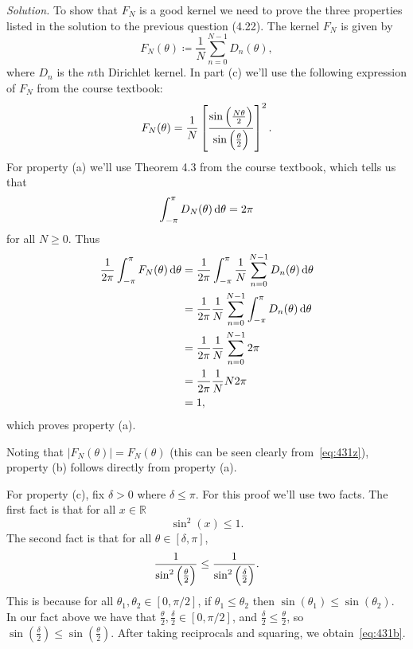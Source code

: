 \documentclass{article}
\newcommand{\R}{\mathbb{R}}
\begin{document}
\textit{Solution.}
To show that $F_N$ is a good kernel we need to prove the three
properties listed in the solution to the previous question (4.22).
The kernel $F_N$ is given by
%
\begin{equation*}
    F_N(\theta) \coloneqq \frac{1}{N} \sum_{n = 0}^{N - 1} D_n (\theta)
    ,
\end{equation*}
%
where $D_n$ is the $n$th Dirichlet kernel. In part (c) we'll use the
following expression of $F_N$ from the course textbook:
%
\begin{equation}
    F_N(\theta) = \frac{1}{N} \sbr{\frac{\sin \del{\frac{N \theta}{2}}}{\sin \del{\frac{\theta}{2}}}}^2
    \label{eq:431z}
    .
\end{equation}
%
For property (a) we'll use Theorem 4.3 from the course textbook, which tells us
that
%
\begin{equation*}
    \int_{- \pi}^\pi D_N(\theta) \dif \theta = 2 \pi
\end{equation*}
%
for all $N \geq 0$. Thus
%
\begin{align*}
    \frac{1}{2 \pi} \int_{- \pi}^\pi F_N(\theta) \dif \theta
        &= \frac{1}{2 \pi} \int_{- \pi}^\pi
            \frac{1}{N} \sum_{n = 0}^{N - 1} D_n(\theta)
            \dif \theta \\
        &= \frac{1}{2 \pi} \frac{1}{N} \sum_{n = 0}^{N - 1}
            \int_{- \pi}^\pi D_n(\theta) \dif \theta \\
        &= \frac{1}{2 \pi} \frac{1}{N} \sum_{n = 0}^{N - 1} 2 \pi \\
        &= \frac{1}{2 \pi} \frac{1}{N} N 2 \pi \\
        &= 1
        ,
\end{align*}
%
which proves property (a).

Noting that $|F_N(\theta)| = F_N(\theta)$ (this can be seen clearly
from~\eqref{eq:431z}), property (b) follows directly from property (a).

For property (c), fix $\delta > 0$ where $\delta \leq \pi$. For
this proof we'll use two facts. The first fact is that for all
$x \in \R$
%
\begin{equation}
    \sin^2(x) \leq 1
    \label{eq:431a}
    .
\end{equation}
%
The second fact is that for all $\theta \in [\delta, \pi]$,
%
\begin{equation}
    \frac{1}{\sin^2 \del{\frac{\theta}{2}}}
    \leq \frac{1}{\sin^2 \del{\frac{\delta}{2}}}
    \label{eq:431b}
    .
\end{equation}
%
This is because for all $\theta_1, \theta_2 \in [0, \pi/2]$,
if $\theta_1 \leq \theta_2$ then $\sin(\theta_1) \leq \sin(\theta_2)$.
In our fact above we have that
$\frac{\theta}{2}, \frac{\delta}{2} \in [0, \pi / 2]$,
and $\frac{\delta}{2} \leq \frac{\theta}{2}$, so
$\sin (\frac{\delta}{2}) \leq \sin (\frac{\theta}{2})$. After taking
reciprocals and squaring, we obtain~\eqref{eq:431b}.
\end{document}
